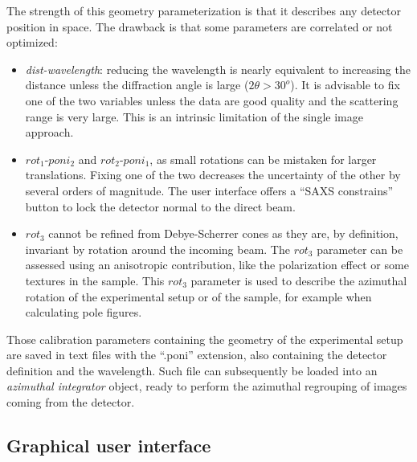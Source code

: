 \documentclass[preprint]{iucr}              %
\begin{document}


The strength of this geometry parameterization is that it describes any detector position in
space. 
The drawback is that some parameters are correlated or not optimized:

\begin{itemize}
  \item \textit{dist-wavelength}: reducing the wavelength is nearly equivalent
  to increasing the distance unless the diffraction angle is 
  large ($2\theta>30^o$). 
  It is advisable to fix one of the two variables unless the data are good
  quality and the scattering range is very large. 
  This is an intrinsic limitation of the single image approach.
  \item $rot_1$-$poni_2$ and $rot_2$-$poni_1$, as small rotations can be
  mistaken for larger translations. 
  Fixing one of the two decreases the uncertainty of the other by several orders of
  magnitude. 
  The user interface offers a ``SAXS constrains'' button to lock the detector normal to the direct beam.
  \item $rot_3$ cannot be refined from Debye-Scherrer cones as they are, by definition,
  invariant by rotation around the incoming beam. 
  The $rot_3$ parameter can be
  assessed using an anisotropic contribution, like the polarization effect or
  some  textures in the sample.
  This $rot_3$ parameter is used to describe the azimuthal rotation of
  the experimental setup or of the sample, for example when calculating pole
  figures.
\end{itemize}
 
Those calibration parameters containing the geometry of the experimental setup 
are saved in text files with the ``.poni'' extension, 
also containing the detector definition and the wavelength.
Such file can subsequently be loaded into an \textit{azimuthal integrator}
object, ready to perform the azimuthal regrouping of images coming from the detector.

\subsection{Graphical user interface}
\end{document}
